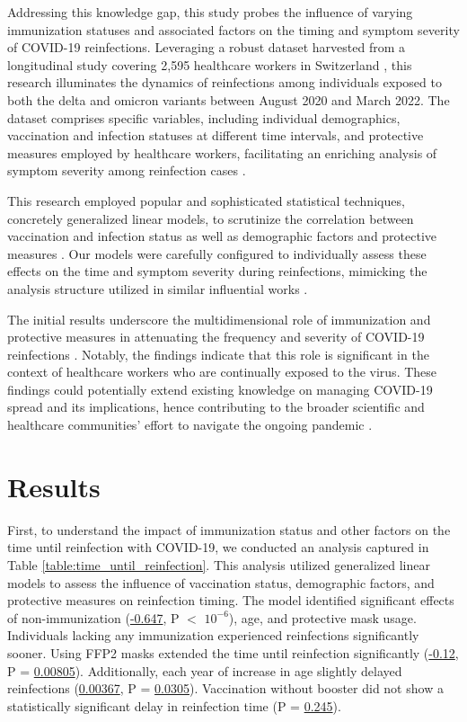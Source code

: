 \documentclass[11pt]{article}
\begin{document}
Addressing this knowledge gap, this study probes the influence of varying immunization statuses and associated factors on the timing and symptom severity of COVID-19 reinfections. Leveraging a robust dataset harvested from a longitudinal study covering 2,595 healthcare workers in Switzerland \cite{Baskin2021HealthcareWR}, this research illuminates the dynamics of reinfections among individuals exposed to both the delta and omicron variants between August 2020 and March 2022. The dataset comprises specific variables, including individual demographics, vaccination and infection statuses at different time intervals, and protective measures employed by healthcare workers, facilitating an enriching analysis of symptom severity among reinfection cases \cite{Pataka2022SleepDA, Ali2018UsageAA}.

This research employed popular and sophisticated statistical techniques, concretely generalized linear models, to scrutinize the correlation between vaccination and infection status as well as demographic factors and protective measures \cite{Loomba2021MeasuringTI}. Our models were carefully configured to individually assess these effects on the time and symptom severity during reinfections, mimicking the analysis structure utilized in similar influential works \cite{Filbin2021LongitudinalPA}. 

The initial results underscore the multidimensional role of immunization and protective measures in attenuating the frequency and severity of COVID-19 reinfections \cite{Huang2020GeneralizedAD, Johansson2021SARSCoV2TF}. Notably, the findings indicate that this role is significant in the context of healthcare workers who are continually exposed to the virus. These findings could potentially extend existing knowledge on managing COVID-19 spread and its implications, hence contributing to the broader scientific and healthcare communities' effort to navigate the ongoing pandemic \cite{Pulliam2022IncreasedRO}.

\section*{Results}

First, to understand the impact of immunization status and other factors on the time until reinfection with COVID-19, we conducted an analysis captured in Table \ref{table:time_until_reinfection}. This analysis utilized generalized linear models to assess the influence of vaccination status, demographic factors, and protective measures on reinfection timing. The model identified significant effects of non-immunization (\hyperlink{A2a}{-0.647}, P $<$ \hyperlink{A2d}{$10^{-6}$}), age, and protective mask usage. Individuals lacking any immunization experienced reinfections significantly sooner. Using FFP2 masks extended the time until reinfection significantly (\hyperlink{A9a}{-0.12}, P = \hyperlink{A9d}{0.00805}). Additionally, each year of increase in age slightly delayed reinfections (\hyperlink{A7a}{0.00367}, P = \hyperlink{A7d}{0.0305}). Vaccination without booster did not show a statistically significant delay in reinfection time (P = \hyperlink{A3d}{0.245}).
\end{document}
